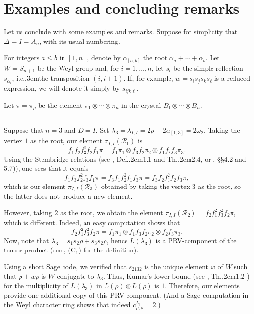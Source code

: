 \documentclass[12pt]{amsart}
\numberwithin{equation}{section}
\theoremstyle{definition}
\def\Def{Def.\kern.2em}
\def\Th{Th.\kern.2em}
\def\ie{{i.e.}\kern.3em}
\def\calR{\mathcal{R}} %
\begin{document}
\let\om\omega


\section{Examples and concluding remarks} 

Let us conclude with some examples and remarks. Suppose for simplicity that $\Delta = I = A_n$, with its usual numbering. 

For integers $a\leq b$ in $[1,n]$, denote by $\alpha_{[a,b]}$ the root $\alpha_a + \cdots + \alpha_b$. 
Let $W = S_{n+1}$ be the Weyl group and, for $i=1,\dots, n$, let $s_i$ be the simple reflection $s_{\alpha_i}$, \ie the transposition $(i,i{+}1)$. If, for example, $w  = s_i s_j s_k s_\ell$ is a reduced expression, we will denote it simply by 
$s_{ijk\ell}$. 

\smallskip 
Let $\pi = \pi_\rho$ be the element $\pi_1\otimes \cdots \otimes \pi_n$ in the crystal 
$B_1 \otimes \cdots \otimes B_n$. 


\subsection{} Suppose that $n=3$ and $D=I$. Set $\lambda_3 = \lambda_{I,I} = 2\rho - 2\alpha_{[1,3]} = 2\omega_2$. 
Taking the vertex $1$ as the root, our element $\pi_{I,I}(\calR_1)$ is 
\begin{equation} 
f_1 f_2 f_3^2 f_2 f_1 \pi = f_1 \pi_1 \otimes f_3 f_2 \pi_2 \otimes f_1 f_2 f_3 \pi_3 . 
\end{equation} 
Using the Stembridge relations (see \cite{St03}, \Def 1.1 and \Th 2.4, or \cite{BS17}, \S\S 4.2 and 5.7)), one sees that it equals 
$$
f_1 f_3 f_2^2 f_3 f_1 \pi = f_3 f_1 f_2^2 f_1 f_3 \pi =  f_3 f_2 f_1^2 f_2 f_3 \pi , 
$$
which is our element $\pi_{I,I}(\calR_3)$ obtained by taking the vertex $3$ as the root, so the latter does not produce a new element. 

\smallskip However, taking $2$ as the root, we obtain the element $\pi_{I,I}(\calR_2) = f_2 f_1^2 f_3^2 f_2 \pi$, 
which is different. Indeed, an easy computation shows that 
\begin{equation} 
f_2 f_1^2 f_3^2 f_2 \pi  = f_1 \pi_1 \otimes f_1 f_3 f_2 \pi_2 \otimes f_2 f_3 \pi_3 . 
\end{equation} 
Now, note that $\lambda_3 = s_1 s_2 \rho + s_3 s_2 \rho$, hence $L(\lambda_3)$ is a PRV-component of the 
tensor product (see \cite{Ku88}, (C$_1$) for the definition).  

\smallskip 
Using  a short Sage code, we verified  that $s_{2132}$ is the unique element $w$ of 
$W$ such that $\rho + w\rho$ is $W$-conjugate to $\lambda_3$. Thus, 
Kumar's lower bound (see \cite{Ku89}, \Th 1.2 ) for the multiplicity of $L(\lambda_3)$ in $L(\rho)\otimes L(\rho)$ is $1$. 
Therefore, our elements provide one additional copy of this PRV-component. (And a Sage computation  in the 
Weyl character ring shows that indeed $c^{\lambda_3}_{\rho,\rho} = 2$.)
\end{document}
